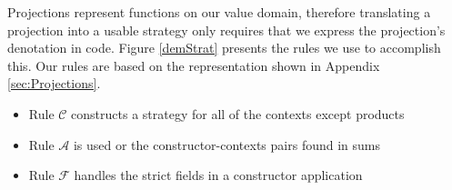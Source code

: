 Projections represent functions on our value domain, therefore translating a
projection into a usable strategy only requires that we express the
projection's denotation in code. Figure \ref{demStrat} presents the rules we
use to accomplish this. Our rules are based on the representation shown in Appendix
\ref{sec:Projections}.

\begin{itemize}
    \item Rule $\mathcal{C}$ constructs a strategy for all of the contexts except products
    \item Rule $\mathcal{A}$ is used or the constructor-contexts pairs found in sums
    \item Rule $\mathcal{F}$ handles the strict fields in a constructor application
\end{itemize}

